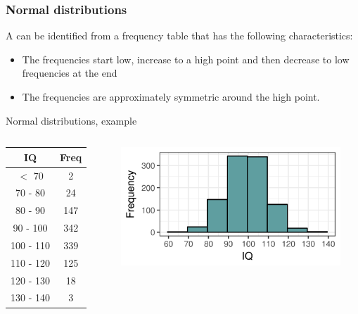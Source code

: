 \documentclass[xcolor=table, aspectratio=169, bigger]{beamer}
\begin{document}
\begin{frame}
\frametitle{Normal distributions}

\begin{block}{}
A  can be identified from a frequency table that has the following characteristics:
\begin{itemize}
\item The frequencies start low, increase to a high point and then decrease to low frequencies at the end
\item The frequencies are approximately symmetric around the high point.
\end{itemize}
\end{block}
\end{frame}

\begin{frame}{Normal distributions, example}

\begin{columns}
\begin{column}{0.35\textwidth}
\begin{exampleblock}{}
\begin{center}
\begin{tabular}{cc}
IQ & Freq \\
\hline
$<$ 70 & 2 \\
70 - 80 & 24 \\
80 - 90 & 147 \\
90 - 100 & 342 \\
100 - 110 & 339 \\
110 - 120 & 125 \\
120 - 130 & 18 \\
130 - 140 & 3 \\
\end{tabular}
\end{center}
\end{exampleblock}
\end{column}
\pause
\begin{column}{0.65\textwidth}
\begin{center}
\includegraphics[width=3.25in]{../images/wk04_iq_hist}

\end{center}
\end{column}
\end{columns}

\end{frame}
\end{document}
